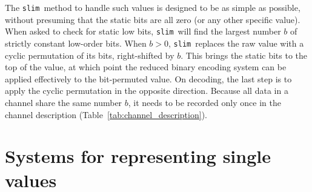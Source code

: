 \documentclass[11pt]{article}
\newcommand{\slim}{{\tt slim}}
\begin{document}
The \slim\ method to handle such values is designed to be as simple as
possible, without presuming that the static bits are all zero (or any
other specific value).  When asked to check for static low bits,
\slim\ will find the largest number $b$ of strictly constant low-order
bits.  When $b>0$, \slim\ replaces the raw value with a cyclic
permutation of its bits, right-shifted by $b$.  This brings the static
bits to the top of the value, at which point the reduced binary
encoding system can be applied effectively to the bit-permuted value.
On decoding, the last step is to apply the cyclic permutation in the
opposite direction.  Because all data in a channel share the same
number $b$, it needs to be recorded only once in the channel
description (Table~\ref{tab:channel_description}).


\appendix
\section{Systems for representing single values}
\label{sec:singlevalue}
\end{document}
